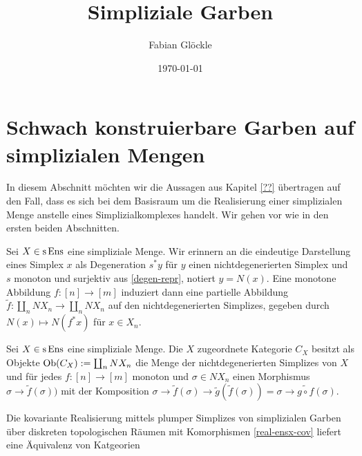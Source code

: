 



\title{Simpliziale Garben}
\author{Fabian Glöckle}
\date{\today}

\section{Schwach konstruierbare Garben auf simplizialen Mengen}

In diesem Abschnitt möchten wir die Aussagen aus Kapitel \ref{??}
übertragen auf den Fall, dass es sich bei dem Basisraum um die
Realisierung einer simplizialen Menge anstelle eines
Simplizialkomplexes handelt. Wir gehen vor wie in den ersten beiden
Abschnitten.

Sei $X \in \operatorname{s}\operatorname{Ens}$ eine simpliziale Menge. Wir erinnern an die
eindeutige Darstellung eines Simplex $x$ als Degeneration $s^* y$ für
$y$ einen nichtdegenerierten Simplex und $s$ monoton und surjektiv aus
\ref{degen-repr}, notiert $y = N(x)$. Eine monotone Abbildung $f: [n]
\to [m]$ induziert dann eine partielle Abbildung $\tilde{f}: \coprod_n
NX_n \to \coprod_n NX_n$ auf den nichtdegenerierten Simplizes, gegeben
durch $N(x) \mapsto N(f^* x)$ für $x \in X_n$.
\begin{defn}
  Sei $X \in \operatorname{s}\operatorname{Ens}$ eine simpliziale Menge. Die $X$ zugeordnete
  Kategorie $C_X$ besitzt als Objekte $\operatorname{Ob}(C_X) := \coprod_n NX_n$ die
  Menge der nichtdegenerierten Simplizes von $X$ und für jedes $f: [n]
  \to [m]$ monoton und $\sigma \in NX_n$ einen Morphismus $\sigma \to
  \tilde{f}(\sigma))$ mit der Komposition $\sigma \to
  \tilde{f}(\sigma) \to \tilde{g}(\tilde{f}(\sigma)) = \sigma \to
  \widetilde{g \circ f}(\sigma)$.
\end{defn}

\begin{prop}
  Die kovariante Realisierung mittels plumper Simplizes von
  simplizialen Garben über diskreten topologischen Räumen mit
  Komorphismen \ref{real-ensx-cov} liefert eine Äquivalenz von
  Katgeorien %
\end{prop}

